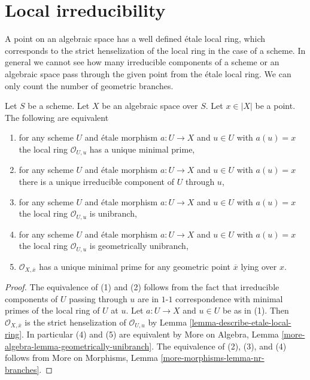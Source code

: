 \section{Local irreducibility}
\label{section-irreducible-local-ring}

\noindent
A point on an algebraic space has a well defined \'etale local ring, which
corresponds to the strict henselization of the local ring in the case of a
scheme. In general we cannot see how many irreducible components of a
scheme or an algebraic space pass through the given point from the
\'etale local ring. We can only count the number of geometric branches.

\begin{lemma}
\label{lemma-irreducible-local-ring}
Let $S$ be a scheme.
Let $X$ be an algebraic space over $S$.
Let $x \in |X|$ be a point.
The following are equivalent
\begin{enumerate}
\item for any scheme $U$ and \'etale morphism $a : U \to X$ and
$u \in U$ with $a(u) = x$ the local ring $\mathcal{O}_{U, u}$ has a
unique minimal prime,
\item for any scheme $U$ and \'etale morphism $a : U \to X$ and
$u \in U$ with $a(u) = x$ there is a unique irreducible component of $U$
through $u$,
\item for any scheme $U$ and \'etale morphism $a : U \to X$ and
$u \in U$ with $a(u) = x$ the local ring $\mathcal{O}_{U, u}$
is unibranch,
\item for any scheme $U$ and \'etale morphism $a : U \to X$ and
$u \in U$ with $a(u) = x$ the local ring $\mathcal{O}_{U, u}$
is geometrically unibranch,
\item $\mathcal{O}_{X, \overline{x}}$ has a unique minimal prime
for any geometric point $\overline{x}$ lying over $x$.
\end{enumerate}
\end{lemma}

\begin{proof}
The equivalence of (1) and (2) follows from the fact that irreducible
components of $U$ passing through $u$ are in $1$-$1$ correspondence with
minimal primes of the local ring of $U$ at $u$. Let $a : U \to X$ and
$u \in U$ be as in (1). Then $\mathcal{O}_{X, \overline{x}}$ is
the strict henselization of $\mathcal{O}_{U, u}$ by
Lemma \ref{lemma-describe-etale-local-ring}.
In particular (4) and (5) are equivalent by
More on Algebra, Lemma \ref{more-algebra-lemma-geometrically-unibranch}.
The equivalence of (2), (3), and (4) follows from
More on Morphisms, Lemma \ref{more-morphisms-lemma-nr-branches}.
\end{proof}

